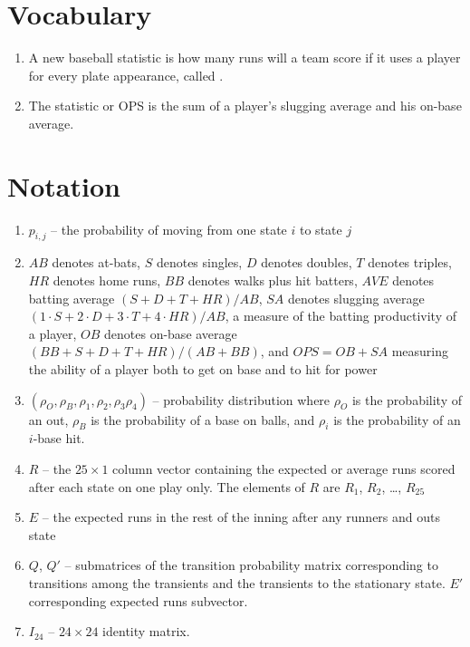 \documentclass[12pt]{article}
\begin{document}
\hr

\section*{Vocabulary}
\begin{enumerate}
    \item
        A new baseball statistic is how many runs will a team score if
        it uses a player for every plate appearance, called .
    \item
        The  statistic or OPS is the sum of
        a player's slugging average and his on-base average.
\end{enumerate}

\hr

\section*{Notation}
\begin{enumerate}
    \item
        \( p_{i,j} \) -- the probability of moving from one state \( i \)
        to state \( j \)
    \item
        \( \mathit{AB} \) denotes at-bats, \( S \) denotes singles, \( D
        \) denotes doubles, \( T \) denotes triples, \( \mathit{HR} \)
        denotes home runs, \( \mathit{BB} \) denotes walks plus hit
        batters, \( \mathit{AVE} \) denotes batting average \( (S + D +
        T + \mathit{HR})/\mathit{AB} \), \( \mathit{SA} \) denotes
        slugging average \( (1 \cdot S + 2 \cdot D + 3 \cdot T + 4 \cdot
        \mathit{HR})/\mathit{AB} \), a measure of the batting
        productivity of a player, \( \mathit{OB} \) denotes on-base
        average \( (\mathit{BB} + S + D + T + \mathit{HR})/(\mathit{AB}+\mathit
        {BB}) \), and \( \mathit{OPS} = \mathit{OB} + \mathit{SA} \)
        measuring the ability of a player both to get on base and to hit
        for power
    \item
        \( (\rho_O, \rho_B, \rho_1, \rho_2, \rho_3 \rho_4) \) --
        probability distribution where \( \rho_O \) is the probability
        of an out, \( \rho_B \) is the probability of a base on balls,
        and \( \rho_i \) is the probability of an \( i \)-base hit.
    \item
        \( R \) -- the \( 25 \times 1 \) column vector containing the
        expected or average runs scored after each state on one play
        only. The elements of \( R \) are \( R_{1} \), \( R_{2} \),
        \dots, \( R_{25} \)
    \item
        \( E \) -- the expected runs in the rest of the inning after any
        runners and outs state
    \item
        \( Q \), \( Q' \) -- submatrices of the transition probability
        matrix corresponding to transitions among the transients and the
        transients to the stationary state.  \( E' \) corresponding
        expected runs subvector.
    \item
        \( I_{24} \) -- \( 24 \times 24 \) identity matrix.
\end{enumerate}
\end{document}

